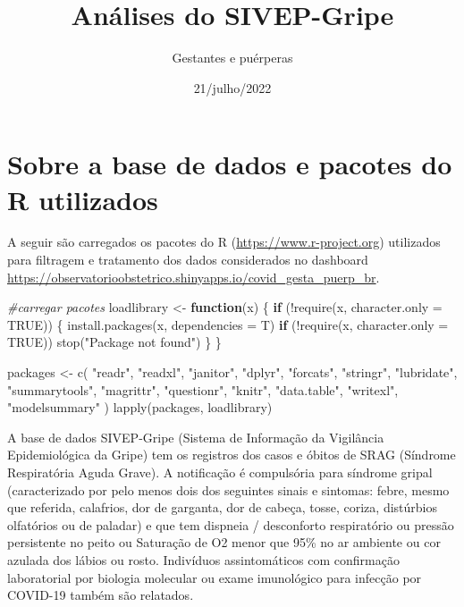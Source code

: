 \documentclass[
]{article}
\title{Análises do SIVEP-Gripe}
\author{Gestantes e puérperas}
\date{21/julho/2022}
\newenvironment{Shaded}{\begin{snugshade}}{\end{snugshade}}
\newcommand{\AttributeTok}[1]{\textcolor[rgb]{0.77,0.63,0.00}{#1}}
\newcommand{\CommentTok}[1]{\textcolor[rgb]{0.56,0.35,0.01}{\textit{#1}}}
\newcommand{\ConstantTok}[1]{\textcolor[rgb]{0.00,0.00,0.00}{#1}}
\newcommand{\ControlFlowTok}[1]{\textcolor[rgb]{0.13,0.29,0.53}{\textbf{#1}}}
\newcommand{\FunctionTok}[1]{\textcolor[rgb]{0.00,0.00,0.00}{#1}}
\newcommand{\NormalTok}[1]{#1}
\newcommand{\OtherTok}[1]{\textcolor[rgb]{0.56,0.35,0.01}{#1}}
\newcommand{\SpecialCharTok}[1]{\textcolor[rgb]{0.00,0.00,0.00}{#1}}
\newcommand{\StringTok}[1]{\textcolor[rgb]{0.31,0.60,0.02}{#1}}
\begin{document}
\maketitle

\hypertarget{sobre-a-base-de-dados-e-pacotes-do-r-utilizados}{%
\section{Sobre a base de dados e pacotes do R
utilizados}\label{sobre-a-base-de-dados-e-pacotes-do-r-utilizados}}

A seguir são carregados os pacotes do R
(\url{https://www.r-project.org}) utilizados para filtragem e tratamento
dos dados considerados no dashboard
\url{https://observatorioobstetrico.shinyapps.io/covid_gesta_puerp_br}.

\begin{Shaded}
\begin{Highlighting}[]
\CommentTok{\#carregar pacotes}
\NormalTok{loadlibrary }\OtherTok{\textless{}{-}} \ControlFlowTok{function}\NormalTok{(x) \{}
  \ControlFlowTok{if}\NormalTok{ (}\SpecialCharTok{!}\FunctionTok{require}\NormalTok{(x, }\AttributeTok{character.only =} \ConstantTok{TRUE}\NormalTok{)) \{}
    \FunctionTok{install.packages}\NormalTok{(x, }\AttributeTok{dependencies =}\NormalTok{ T)}
    \ControlFlowTok{if}\NormalTok{ (}\SpecialCharTok{!}\FunctionTok{require}\NormalTok{(x, }\AttributeTok{character.only =} \ConstantTok{TRUE}\NormalTok{))}
      \FunctionTok{stop}\NormalTok{(}\StringTok{"Package not found"}\NormalTok{)}
\NormalTok{  \}}
\NormalTok{\}}

\NormalTok{packages }\OtherTok{\textless{}{-}}
  \FunctionTok{c}\NormalTok{(}
    \StringTok{"readr"}\NormalTok{,}
    \StringTok{"readxl"}\NormalTok{,}
    \StringTok{"janitor"}\NormalTok{,}
    \StringTok{"dplyr"}\NormalTok{,}
    \StringTok{"forcats"}\NormalTok{,}
    \StringTok{"stringr"}\NormalTok{,}
    \StringTok{"lubridate"}\NormalTok{,}
    \StringTok{"summarytools"}\NormalTok{,}
    \StringTok{"magrittr"}\NormalTok{,}
    \StringTok{"questionr"}\NormalTok{,}
    \StringTok{"knitr"}\NormalTok{,}
    \StringTok{"data.table"}\NormalTok{,}
    \StringTok{"writexl"}\NormalTok{,}
    \StringTok{"modelsummary"}
\NormalTok{  )}
\FunctionTok{lapply}\NormalTok{(packages, loadlibrary)}
\end{Highlighting}
\end{Shaded}

A base de dados SIVEP-Gripe (Sistema de Informação da Vigilância
Epidemiológica da Gripe) tem os registros dos casos e óbitos de SRAG
(Síndrome Respiratória Aguda Grave). A notificação é compulsória para
síndrome gripal (caracterizado por pelo menos dois dos seguintes sinais
e sintomas: febre, mesmo que referida, calafrios, dor de garganta, dor
de cabeça, tosse, coriza, distúrbios olfatórios ou de paladar) e que tem
dispneia / desconforto respiratório ou pressão persistente no peito ou
Saturação de O2 menor que 95\% no ar ambiente ou cor azulada dos lábios
ou rosto. Indivíduos assintomáticos com confirmação laboratorial por
biologia molecular ou exame imunológico para infecção por COVID-19
também são relatados.
\end{document}
